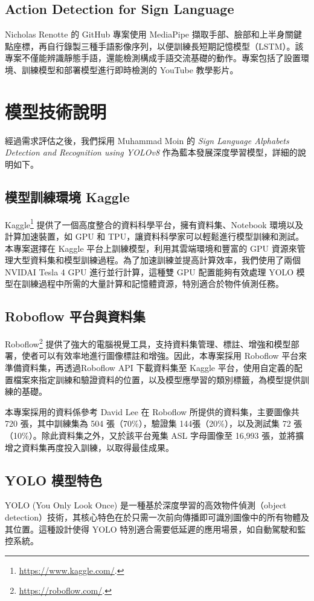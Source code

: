 \documentclass[conference]{IEEEtran}
\begin{document}
\subsection{Action Detection for Sign Language}
Nicholas Renotte 的 GitHub 專案使用 MediaPipe 擷取手部、臉部和上半身關鍵點座標，再自行錄製三種手語影像序列，以便訓練長短期記憶模型（LSTM）\cite{nick
nochnack2024action}。該專案不僅能辨識靜態手語，還能檢測構成手語交流基礎的動作。專案包括了設置環境、訓練模型和部署模型進行即時檢測的 YouTube 教學影片。 

\section{模型技術說明}

經過需求評估之後，我們採用 Muhammad Moin 的 \textit{Sign Language Alphabets Detection and Recognition using YOLOv8} 作為藍本發展深度學習模型，詳細的說明如下。

\subsection{模型訓練環境 Kaggle}
Kaggle\footnote{\url{https://www.kaggle.com/}.} 提供了一個高度整合的資料科學平台，擁有資料集、Notebook 環境以及計算加速裝置，如 GPU 和 TPU，讓資料科學家可以輕鬆進行模型訓練和測試。本專案選擇在 Kaggle 平台上訓練模型，利用其雲端環境和豐富的 GPU 資源來管理大型資料集和模型訓練過程。為了加速訓練並提高計算效率，我們使用了兩個 NVIDAI Tesla 4 GPU 進行並行計算，這種雙 GPU 配置能夠有效處理 YOLO 模型在訓練過程中所需的大量計算和記憶體資源，特別適合於物件偵測任務。

\subsection{Roboflow 平台與資料集}
Roboflow\footnote{\url{https://roboflow.com/}.} 提供了強大的電腦視覺工具，支持資料集管理、標註、增強和模型部署，使者可以有效率地進行圖像標註和增強。因此，本專案採用 Roboflow 平台來準備資料集，再透過Roboflow API 下載資料集至 Kaggle 平台，使用自定義的配置檔案來指定訓練和驗證資料的位置，以及模型應學習的類別標籤，為模型提供訓練的基礎。

本專案採用的資料係參考 David Lee\cite{davidlee2024asl} 在 Roboflow 所提供的資料集，主要圖像共 720 張，其中訓練集為 504 張（70\%），驗證集 144張（20\%），以及測試集 72 張（10\%）。除此資料集之外，又於該平台蒐集 ASL 字母圖像至 16,993 張，並將擴增之資料集再度投入訓練，以取得最佳成果。 

\subsection{YOLO 模型特色}
YOLO (You Only Look Once) 是一種基於深度學習的高效物件偵測（object detection）技術，其核心特色在於只需一次前向傳播即可識別圖像中的所有物體及其位置。這種設計使得 YOLO 特別適合需要低延遲的應用場景，如自動駕駛和監控系統。
\end{document}
